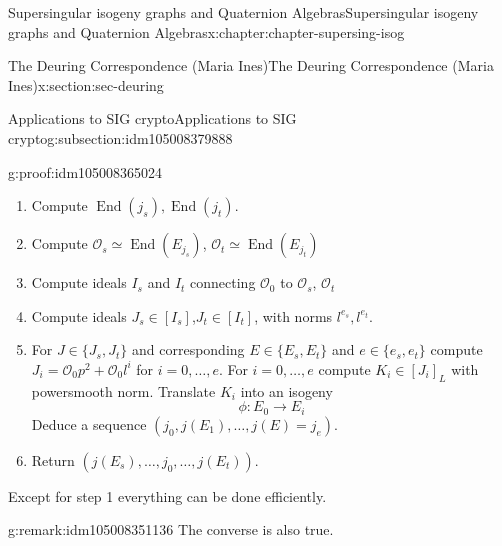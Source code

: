 \documentclass[oneside,10pt,]{book}
\numberwithin{equation}{section}
\newcommand{\lb}{[}
\newcommand{\rb}{]}
\newcommand{\ints}{\mathcal{O}}
\DeclareMathOperator{\End}{End}
\begin{document}
\begin{chapterptx}{Supersingular isogeny graphs and Quaternion Algebras}{}{Supersingular isogeny graphs and Quaternion Algebras}{}{}{x:chapter:chapter-supersing-isog}
\begin{sectionptx}{The Deuring Correspondence (Maria Ines)}{}{The Deuring Correspondence (Maria Ines)}{}{}{x:section:sec-deuring}
\begin{subsectionptx}{Applications to SIG crypto}{}{Applications to SIG crypto}{}{}{g:subsection:idm105008379888}
\begin{proofptx}{}{g:proof:idm105008365024}
\begin{enumerate}
\item{}Compute \(\End(j_s),\End(j_t)\).%
\item{}Compute \(\ints_s \simeq \End(E_{j_s})\), \(\ints_t \simeq \End(E_{j_t})\)%
\item{}Compute ideals \(I_s\) and \(I_t\) connecting \(\ints_0 \) to \(\ints_s\), \(\ints_t\)%
\item{}Compute ideals \(J_s \in \lb I_s \rb\),\(J_t \in \lb I_t \rb\), with norms \(l^{e_s},l^{e_t}\).%
\item{}For \(J \in \{J_s,J_t\}\) and corresponding \(E \in \{E_s,E_t\}\) and \(e\in \{e_s, e_t\}\) compute \(J_i = \ints_0 p^2 + \ints_0 l^i\) for \(i = 0,\ldots, e\). For \(i = 0,\ldots, e\) compute \(K_i \in \lb J_i \rb_L\) with powersmooth norm. Translate \(K_i\) into an isogeny%
\begin{equation*}
\phi\colon E_0 \to E_i
\end{equation*}
Deduce a sequence \((j_0, j(E_1),\ldots,j(E) = j_e)\).%
\item{}Return \((j(E_s), \ldots,j_0, \ldots,j(E_t))\).%
\end{enumerate}
%
\par
Except for step 1 everything can be done efficiently.%
\end{proofptx}
\begin{remark}{}{g:remark:idm105008351136}%
The converse is also true.%
\end{remark}
\end{subsectionptx}
\end{sectionptx}
\end{chapterptx}
%
%
\typeout{************************************************}
\typeout{************************************************}
%
\end{document}
